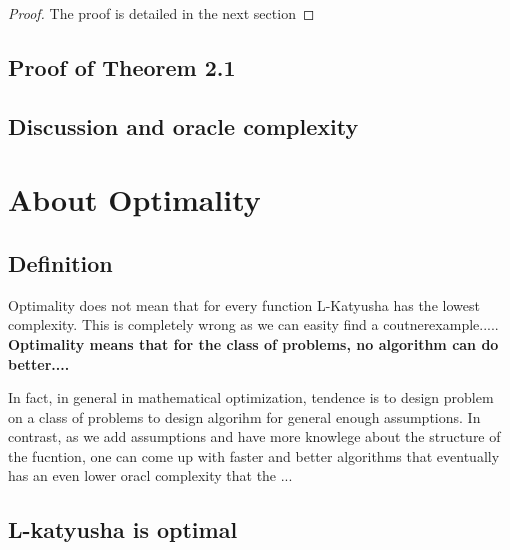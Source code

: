 \documentclass[12pt]{report}
\begin{document}
\begin{proof}
The proof is detailed in the next section
\end{proof}

\section{Proof of Theorem 2.1}


\section{Discussion and oracle complexity}


\chapter{About Optimality}
\section{Definition}

{{Optimality does not mean that for every function L-Katyusha has the lowest complexity. This is completely wrong as we can easity find a coutnerexample.....}}
\textbf{Optimality means that for the class of problems, no algorithm can do better....}

In fact, in general in mathematical optimization, tendence is to design problem on a class of problems to design algorihm for general enough assumptions. In contrast, as we add assumptions and have more knowlege about the structure of the fucntion, one can come up with faster and better algorithms that eventually has an even lower oracl complexity that the ...
\section{L-katyusha is optimal}

{}

\end{document}
